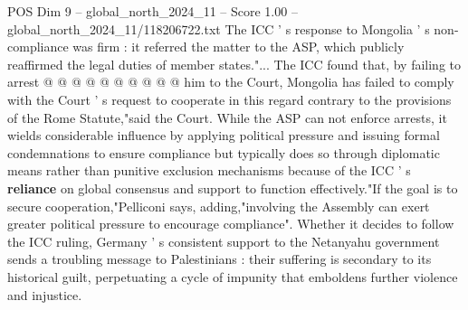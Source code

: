 \begin{textsample}{POS Dim 9 – global\_north\_2024\_11 – Score 1.00 – global\_north\_2024\_11/118206722.txt}
The ICC ' s response to Mongolia ' s non-compliance was firm : it referred the matter to the ASP, which publicly reaffirmed the legal duties of member states."...
The ICC found that, by failing to arrest @ @ @ @ @ @ @ @ @ @ him to the Court, Mongolia has failed to comply with the Court ' s request to cooperate in this regard contrary to the provisions of the Rome Statute,"said the Court.
While the ASP can not enforce arrests, it wields considerable influence by applying political pressure and issuing formal condemnations to ensure compliance but typically does so through diplomatic means rather than punitive exclusion mechanisms because of the ICC ' s \textbf{reliance} on global consensus and support to function effectively."If the goal is to secure cooperation,"Pelliconi says, adding,"involving the Assembly can exert greater political pressure to encourage compliance".
Whether it decides to follow the ICC ruling, Germany ' s consistent support to the Netanyahu government sends a troubling message to Palestinians : their suffering is secondary to its historical guilt, perpetuating a cycle of impunity that emboldens further violence and injustice.

\end{textsample}
